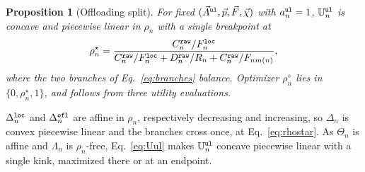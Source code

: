 \documentclass[journal]{IEEEtran}
\newtheorem{proposition}{Proposition}
\begin{document}
\begin{proposition}[Offloading split]\label{prop:rho}
For fixed $(\vec{A}^{\tt ul},\vec{p},\vec{F},\vec{\chi})$ with $a_n^{\tt ul}=1$, $\mathbb{U}_n^{\tt ul}$ is concave and piecewise linear in $\rho_n$ with a single breakpoint at
\begin{equation}
\rho_n^\star
=\frac{C_n^{\tt raw}/F_n^{\tt loc}}
{C_n^{\tt raw}/F_n^{\tt loc}+D_n^{\tt raw}/R_n+C_n^{\tt raw}/F_{n m(n)}},
\label{eq:rhostar}
\end{equation}
where the two branches of Eq.~\eqref{eq:branches} balance. 
{Optimizer $\rho_n^\diamond$ lies in $\{0,\rho_n^\star,1\}$, and follows from three utility evaluations.}
\end{proposition}
\begin{IEEEproof}
$\Delta_n^{\tt loc}$ and $\Delta_n^{\tt ofl}$ are affine in $\rho_n$, respectively decreasing and increasing, so $\Delta_n$ is convex piecewise linear and the branches cross once, at Eq.~\eqref{eq:rhostar}. As $\Theta_n$ is affine and $\Lambda_n$ is $\rho_n$-free, Eq.~\eqref{eq:Uul} makes $\mathbb{U}_n^{\tt ul}$ concave piecewise linear with a single kink, maximized there or at an endpoint.
\end{IEEEproof}
\end{document}
